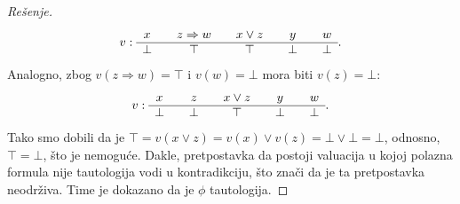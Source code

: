 \begin{proof}[Re\v senje]
  $$
    v : \begin{array}{c@{\qquad}c@{\qquad}c@{\qquad}c@{\qquad}c}
      x & z \Rightarrow w & x \lor z & y & w\\
      \hline
      \bot & \top & \top & \bot & \bot
    \end{array}.
  $$
  Analogno, zbog $v(z \Rightarrow w) = \top$ i $v(w) = \bot$ mora biti $v(z) = \bot$:
  $$
    v : \begin{array}{c@{\qquad}c@{\qquad}c@{\qquad}c@{\qquad}c}
      x & z & x \lor z & y & w\\
      \hline
      \bot & \bot & \top & \bot & \bot
    \end{array}.
  $$
  Tako smo dobili da je $\top = v(x \lor z) = v(x) \lor v(z) = \bot \lor \bot = \bot$, 
  odnosno, $\top = \bot$, \v sto je nemogu\'ce.
  Dakle, pretpostavka da postoji valuacija u kojoj polazna formula nije tautologija vodi u kontradikciju,
  \v sto zna\v ci da je ta pretpostavka neodr\v ziva. Time je dokazano da je $\phi$ tautologija.
\end{proof}

